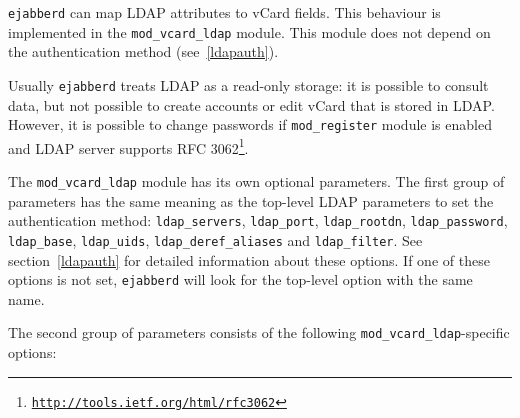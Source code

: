 \documentclass[a4paper,10pt]{book}
\newcommand{\option}[1]{\texttt{#1}}
\newcommand{\ejabberd}{\texttt{ejabberd}}
\newcommand{\module}[1]{\texttt{#1}}
\newcommand{\modvcardldap}{\module{mod\_vcard\_ldap}}
\gdef\footahref#1#2{#2\footnote{\href{#1}{\texttt{#1}}}}
\begin{document}

\ejabberd{} can map LDAP attributes to vCard fields. This behaviour is
implemented in the \modvcardldap{} module. This module does not depend on the
authentication method (see~\ref{ldapauth}).

Usually \ejabberd{} treats LDAP as a read-only storage:
it is possible to consult data, but not possible to
create accounts or edit vCard that is stored in LDAP.
However, it is possible to change passwords if \module{mod\_register} module is enabled
and LDAP server supports
\footahref{http://tools.ietf.org/html/rfc3062}{RFC 3062}.

The \modvcardldap{} module has
its own optional parameters. The first group of parameters has the same
meaning as the top-level LDAP parameters to set the authentication method:
\option{ldap\_servers}, \option{ldap\_port}, \option{ldap\_rootdn},
\option{ldap\_password}, \option{ldap\_base}, \option{ldap\_uids},
\option{ldap\_deref\_aliases} and \option{ldap\_filter}.
See section~\ref{ldapauth} for detailed information
about these options. If one of these options is not set, \ejabberd{} will look
for the top-level option with the same name.

The second group of parameters
consists of the following \modvcardldap{}-specific options:
\end{document}
